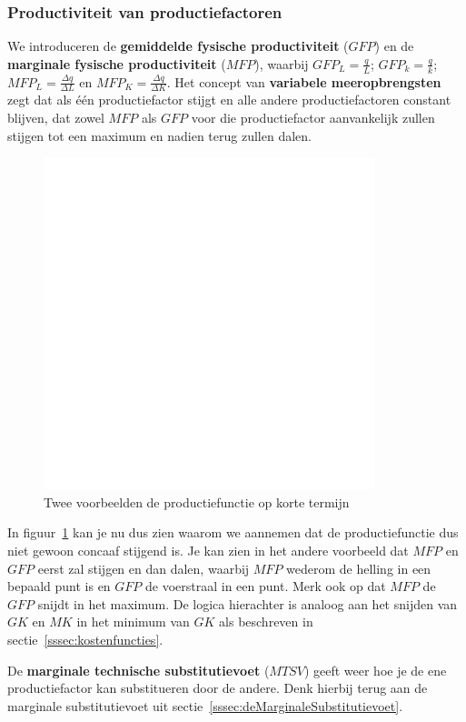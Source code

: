 \subsubsection{Productiviteit van productiefactoren} 
We introduceren de \textbf{gemiddelde fysische productiviteit} ($GFP$) en de \textbf{marginale fysische productiviteit} ($MFP$), waarbij $GFP_L = \frac{q}{L}$; $GFP_k = \frac{q}{k}$; $MFP_L = \frac{\Delta q}{\Delta L}$ en  $MFP_K = \frac{\Delta q}{\Delta K}$. Het concept van \textbf{variabele meeropbrengsten} zegt dat als \'e\'en productiefactor stijgt en alle andere productiefactoren constant blijven, dat zowel $MFP$ als $GFP$ voor die productiefactor aanvankelijk zullen stijgen tot een maximum en nadien terug zullen dalen.
\begin{figure}[htbp]
	\centering
	\includegraphics[scale=0.4]{Images/white.png}
	\caption{Twee voorbeelden de productiefunctie op korte termijn}
	\label{fig:productiefunctieKorteTermijn}
\end{figure}

In figuur~\ref{fig:productiefunctieKorteTermijn} kan je nu dus zien waarom we aannemen dat de productiefunctie dus niet gewoon concaaf stijgend is. Je kan zien in het andere voorbeeld dat $MFP$ en $GFP$ eerst zal stijgen en dan dalen, waarbij $MFP$ wederom de helling in een bepaald punt is en $GFP$ de voerstraal in een punt. Merk ook op dat $MFP$ de $GFP$ snijdt in het maximum. De logica hierachter is analoog aan het snijden van $GK$ en $MK$ in het minimum van $GK$ als beschreven in sectie~\ref{sssec:kostenfuncties}.

De \textbf{marginale technische substitutievoet} ($MTSV$) geeft weer hoe je de ene productiefactor kan substitueren door de andere. Denk hierbij terug aan de marginale substitutievoet uit sectie~\ref{sssec:deMarginaleSubstitutievoet}.

